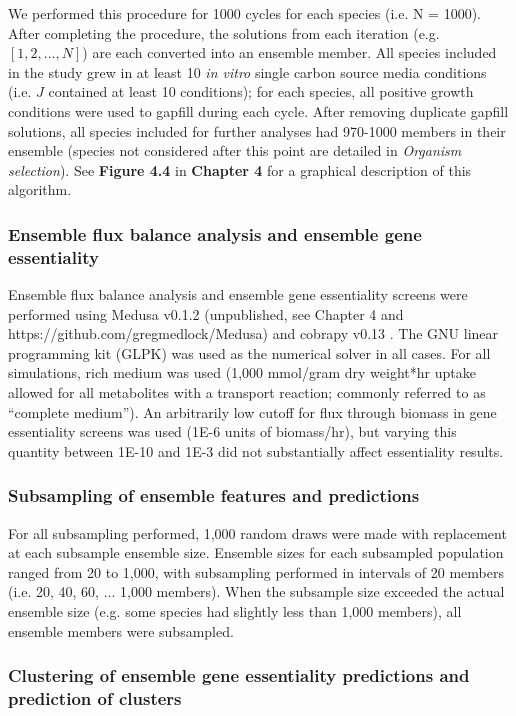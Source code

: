 \documentclass[11pt,twocolumn,notitlepage,openany,twoside]{book}
\begin{document}
\begin{refsection}
We performed this procedure for 1000 cycles for each species (i.e. N = 1000). After completing the procedure, the solutions from each iteration (e.g. $[1,2,...,N]$) are each converted into an ensemble member. All species included in the study grew in at least 10 \textit{in vitro} single carbon source media conditions (i.e. $J$ contained at least 10 conditions); for each species, all positive growth conditions were used to gapfill during each cycle. After removing duplicate gapfill solutions, all species included for further analyses had 970-1000 members in their ensemble (species not considered after this point are detailed in \textit{Organism selection}). See \textbf{Figure 4.4} in \textbf{Chapter 4} for a graphical description of this algorithm.

\subsubsection{Ensemble flux balance analysis and ensemble gene essentiality}

Ensemble flux balance analysis and ensemble gene essentiality screens were performed using Medusa v0.1.2 (unpublished, see Chapter 4 and https://github.com/gregmedlock/Medusa) and cobrapy v0.13 \cite{Ebrahim2013-eb}. The GNU linear programming kit (GLPK) was used as the numerical solver in all cases. For all simulations, rich medium was used (1,000 mmol/gram dry weight*hr uptake allowed for all metabolites with a transport reaction; commonly referred to as “complete medium”). An arbitrarily low cutoff for flux through biomass in gene essentiality screens was used (1E-6 units of biomass/hr), but varying this quantity between 1E-10 and 1E-3 did not substantially affect essentiality results.

\subsubsection{Subsampling of ensemble features and predictions}

For all subsampling performed, 1,000 random draws were made with replacement at each subsample ensemble size. Ensemble sizes for each subsampled population ranged from 20 to 1,000, with subsampling performed in intervals of 20 members (i.e. 20, 40, 60, ... 1,000 members). When the subsample size exceeded the actual ensemble size (e.g. some species had slightly less than 1,000 members), all ensemble members were subsampled.

\subsubsection{Clustering of ensemble gene essentiality predictions and prediction of clusters}


\end{refsection}
\end{document}
